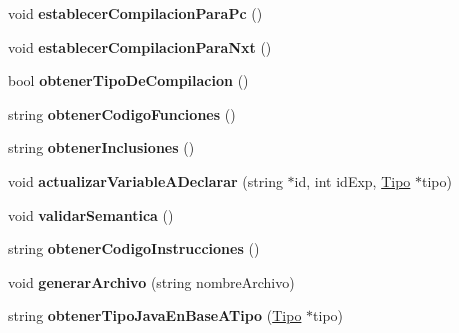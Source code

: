 \begin{DoxyCompactItemize}
\item 
\hypertarget{class_programa_a6c4bfc90ae5e95cd6f38f7e293f9755e}{void {\bfseries establecer\-Compilacion\-Para\-Pc} ()}\label{class_programa_a6c4bfc90ae5e95cd6f38f7e293f9755e}

\item 
\hypertarget{class_programa_a7f08882c57abd4a3972f57fef84b268e}{void {\bfseries establecer\-Compilacion\-Para\-Nxt} ()}\label{class_programa_a7f08882c57abd4a3972f57fef84b268e}

\item 
\hypertarget{class_programa_a22c533a635e75f5c2b9114c92b89d45f}{bool {\bfseries obtener\-Tipo\-De\-Compilacion} ()}\label{class_programa_a22c533a635e75f5c2b9114c92b89d45f}

\item 
\hypertarget{class_programa_a643eb90129b486f2d8a67d245d38d653}{string {\bfseries obtener\-Codigo\-Funciones} ()}\label{class_programa_a643eb90129b486f2d8a67d245d38d653}

\item 
\hypertarget{class_programa_a26fc6c08728e3337c2bfb0b768cf774b}{string {\bfseries obtener\-Inclusiones} ()}\label{class_programa_a26fc6c08728e3337c2bfb0b768cf774b}

\item 
\hypertarget{class_programa_aca11f6401680946decd8909ab88d2c16}{void {\bfseries actualizar\-Variable\-A\-Declarar} (string $\ast$id, int id\-Exp, \hyperlink{class_tipo}{Tipo} $\ast$tipo)}\label{class_programa_aca11f6401680946decd8909ab88d2c16}

\item 
\hypertarget{class_programa_a693f3abbdb8399755241b6d06ce208ad}{void {\bfseries validar\-Semantica} ()}\label{class_programa_a693f3abbdb8399755241b6d06ce208ad}

\item 
\hypertarget{class_programa_a4ce4578e6ad7a916addaa1573ab6ed84}{string {\bfseries obtener\-Codigo\-Instrucciones} ()}\label{class_programa_a4ce4578e6ad7a916addaa1573ab6ed84}

\item 
\hypertarget{class_programa_ad045bb4eb79de26cf698292595a0cf91}{void {\bfseries generar\-Archivo} (string nombre\-Archivo)}\label{class_programa_ad045bb4eb79de26cf698292595a0cf91}

\item 
\hypertarget{class_programa_aadd9a6f4b3b7ce034a1015cdf9785ecf}{string {\bfseries obtener\-Tipo\-Java\-En\-Base\-A\-Tipo} (\hyperlink{class_tipo}{Tipo} $\ast$tipo)}\label{class_programa_aadd9a6f4b3b7ce034a1015cdf9785ecf}


\end{DoxyCompactItemize}
